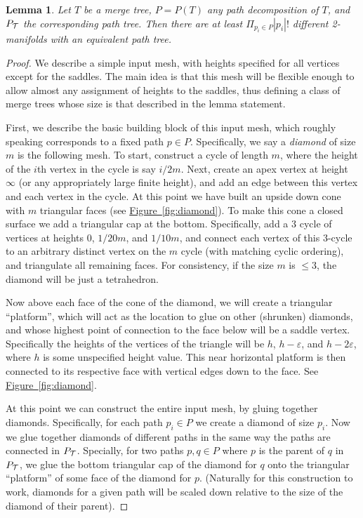 \documentclass[11pt]{article}
\newtheorem{lemma}[theorem]{Lemma}
\theoremstyle{definition}
\newcommand{\eps}{\varepsilon}
\newcommand{\Fig}[1]{\hyperref[fig:#1]{Figure~\ref*{fig:#1}}} %
\begin{document}
\begin{lemma}
\label{lem:pathDecomp}
Let $T$ be a merge tree, $P = P(T)$ any path decomposition of $T$, and $P_{\mathcal{T}}$ the corresponding path tree.  
Then there are at least $\Pi_{p_i\in P} |p_i|!$ different 2-manifolds with an equivalent path tree.
\end{lemma}
\begin{proof}
 We describe a simple input mesh, with heights specified for all vertices except for the saddles.  The main idea is that 
 this mesh will be flexible enough to allow almost any assignment of heights to the saddles, thus defining a class of merge trees 
 whose size is that described in the lemma statement.
 
 First, we describe the basic building block of this input mesh, which roughly speaking corresponds to a fixed path $p\in P$.  
 Specifically, we say a \emph{diamond} of size $m$ is the following mesh.  To start, construct a cycle 
 of length $m$, where the height of the $i$th vertex in the cycle is say $i/2m$.  Next, create an apex vertex at height 
 $\infty$ (or any appropriately large finite height), and add an edge between this vertex and each vertex in the cycle.  At this point 
 we have built an upside down cone with $m$ triangular faces (see \Fig{diamond}). To make this cone a closed surface we add a triangular cap at the bottom. 
 Specifically, add a $3$ cycle of vertices at heights $0$, $1/20m$, and $1/10m$, and connect each vertex of this $3$-cycle to an arbitrary distinct 
 vertex on the $m$ cycle (with matching cyclic ordering), and triangulate all remaining faces.  For consistency, if the size $m$ is $\leq 3$, the diamond 
 will be just a tetrahedron.
 
 Now above each face of the cone of the diamond, we will create a triangular ``platform'', which will act as the location to glue on other (shrunken) diamonds, 
 and whose highest point of connection to the face below will be a saddle vertex.  Specifically the heights of the vertices of the triangle will be $h$, $h-\eps$, and $h-2\eps$, where 
 $h$ is some unspecified height value.  This near horizontal platform is then connected to its respective face with vertical edges down to the face. See \Fig{diamond}.
 
 At this point we can construct the entire input mesh, by gluing together diamonds.  Specifically, for each path $p_i\in P$ we create a diamond of size $p_i$.
 Now we glue together diamonds of different paths in the same way the paths are connected in $P_{\mathcal{T}}$.  Specially, for two paths $p,q\in P$ where 
 $p$ is the parent of $q$ in $P_{\mathcal{T}}$, we glue the bottom triangular cap of the diamond for $q$ onto the triangular ``platform'' of some face of the diamond for $p$.
 (Naturally for this construction to work, diamonds for a given path will be scaled down relative to the size of the diamond of their parent).
 

\end{proof}
\end{document}

